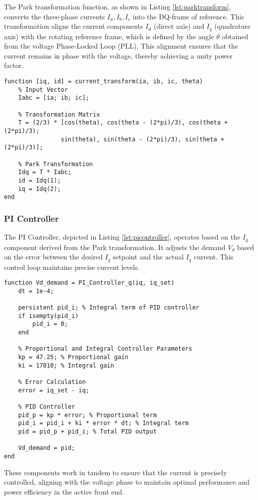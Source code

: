 The Park transformation function, as shown in Listing \ref{lst:parktransform},
converts the three-phase currents \( I_a, I_b, I_c \) into the DQ-frame of
reference. This transformation aligns the current components \( I_d \) (direct
axis) and \( I_q \) (quadrature axis) with the rotating reference frame, which
is defined by the angle \( \theta \) obtained from the voltage Phase-Locked
Loop (PLL). This alignment ensures that the current remains in phase with the
voltage, thereby achieving a unity power factor.

\begin{lstlisting}[style=MATLAB, caption={Park Transformation}, label={lst:parktransform}]
function [iq, id] = current_transform(ia, ib, ic, theta)
    % Input Vector
    Iabc = [ia; ib; ic];

    % Transformation Matrix
    T = (2/3) * [cos(theta), cos(theta - (2*pi)/3), cos(theta + (2*pi)/3);
                sin(theta), sin(theta - (2*pi)/3), sin(theta + (2*pi)/3)];

    % Park Transformation
    Idq = T * Iabc;
    id = Idq(1);
    iq = Idq(2);
end
\end{lstlisting}

\subsubsection{PI Controller}

The PI Controller, depicted in Listing \ref{lst:picontroller}, operates based
on the \( I_q \) component derived from the Park transformation. It adjusts the
demand \( V_d \) based on the error between the desired \( I_q \) setpoint and
the actual \( I_q \) current. This control loop maintains precise current
levels.\\

\begin{lstlisting}[style=MATLAB, caption={PI Controller}, label={lst:picontroller}]
function Vd_demand = PI_Controller_q(iq, iq_set)
    dt = 1e-4;
    
    persistent pid_i; % Integral term of PID controller
    if isempty(pid_i)
        pid_i = 0;
    end
    
    % Proportional and Integral Controller Parameters
    kp = 47.25; % Proportional gain
    ki = 17010; % Integral gain
    
    % Error Calculation
    error = iq_set - iq;
    
    % PID Controller
    pid_p = kp * error; % Proportional term
    pid_i = pid_i + ki * error * dt; % Integral term
    pid = pid_p + pid_i; % Total PID output
    
    Vd_demand = pid;
end
\end{lstlisting}

These components work in tandem to ensure that the current is precisely
controlled, aligning with the voltage phase to maintain optimal performance and
power efficiency in the active front end.

